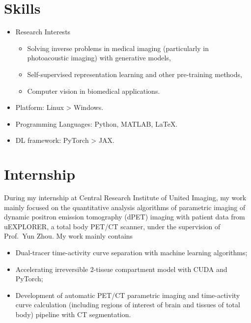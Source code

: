 \documentclass{resume}
\begin{document}

\section{Skills}
\begin{itemize}
    \item Research Interests
    \begin{itemize}
        \item Solving inverse problems in medical imaging (particularly in photoacoustic imaging) with generative models,
        \item Self-supervised representation learning and other pre-training methods,
        \item Computer vision in biomedical applications.
    \end{itemize}
    \item Platform: Linux > Windows.
    \item Programming Languages: Python, MATLAB, \LaTeX{}.
    \item DL framework: PyTorch > JAX.
\end{itemize}

\section{Internship}
During my internship at Central Research Institute of United Imaging, my work mainly focused on the quantitative analysis algorithms of parametric imaging of dynamic positron emission tomography (dPET) imaging with patient data from uEXPLORER, a total body PET/CT scanner, under the supervision of Prof.~Yun Zhou. My work mainly contains
\begin{itemize}
    \item Dual-tracer time-activity curve separation with machine learning algorithms;
    \item Accelerating irreversible 2-tissue compartment model with CUDA and PyTorch;
    \item Development of automatic PET/CT parametric imaging and time-activity curve calculation (including regions of interest of brain and tissues of total body) pipeline with CT segmentation.
\end{itemize}
\end{document}
